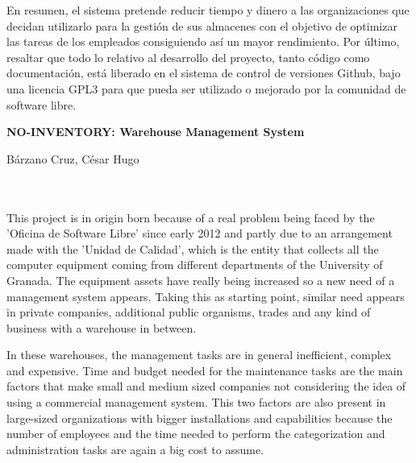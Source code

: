 En resumen, el sistema pretende reducir tiempo y dinero a las organizaciones que decidan utilizarlo para la gestión de sus almacenes con el objetivo  de optimizar las tareas de los empleados consiguiendo así un mayor rendimiento. 
Por último, resaltar que todo lo relativo al desarrollo del proyecto, tanto código como documentación, está liberado en el sistema de control de versiones Github, bajo una licencia GPL3 para que pueda ser utilizado o mejorado por la comunidad de software libre.


\cleardoublepage


\thispagestyle{empty}


\begin{center}
{\large\bfseries NO-INVENTORY: Warehouse Management System}\\
\end{center}
\begin{center}
Bárzano Cruz, César Hugo\\
\end{center}

\\

\vspace{0.7cm}
\\

This project is in origin born because of a real problem being faced by the 'Oficina de Software Libre' since early 2012 and partly due to an arrangement made with the 'Unidad de Calidad', which is the entity that collects all the computer equipment coming from different departments of the University of Granada. The equipment assets have really being increased so a new need of a management system appears. Taking this as starting point, similar need appears in private companies, additional public organisms, trades and any kind of business with a warehouse in between.

In these warehouses, the management tasks are in general inefficient, complex and expensive.
Time and budget needed for the maintenance tasks are the main factors that make small and medium sized companies not considering the idea of using a commercial management system. This two factors are also present in large-sized organizations with bigger installations and capabilities because the number of employees and the time needed to perform the categorization and administration tasks are again a big cost to assume.


